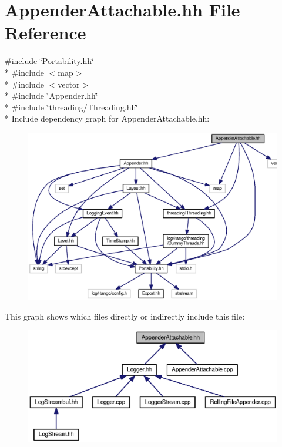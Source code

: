 \section{Appender\-Attachable.\-hh File Reference}
\label{AppenderAttachable_8hh}
{\ttfamily \#include \char`\"{}Portability.\-hh\char`\"{}}\\*
{\ttfamily \#include $<$map$>$}\\*
{\ttfamily \#include $<$vector$>$}\\*
{\ttfamily \#include \char`\"{}Appender.\-hh\char`\"{}}\\*
{\ttfamily \#include \char`\"{}threading/\-Threading.\-hh\char`\"{}}\\*
Include dependency graph for Appender\-Attachable.\-hh\-:
\nopagebreak
\begin{figure}[H]
\begin{center}
\leavevmode
\includegraphics[width=350pt]{d1/d8a/AppenderAttachable_8hh__incl}
\end{center}
\end{figure}
This graph shows which files directly or indirectly include this file\-:
\nopagebreak
\begin{figure}[H]
\begin{center}
\leavevmode
\includegraphics[width=350pt]{d8/d75/AppenderAttachable_8hh__dep__incl}
\end{center}
\end{figure}
